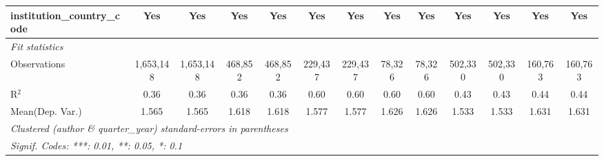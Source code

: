 \begin{tabular}{lcccccccccccc}
   institution\_country\_code               & Yes            & Yes          & Yes           & Yes           & Yes          & Yes            & Yes           & Yes            & Yes            & Yes           & Yes            & Yes\\  
   \midrule
   \emph{Fit statistics}\\
   Observations                             & 1,653,148      & 1,653,148    & 468,852       & 468,852       & 229,437      & 229,437        & 78,326        & 78,326         & 502,330        & 502,330       & 160,763        & 160,763\\  
   R$^2$                                    & 0.36           & 0.36         & 0.36          & 0.36          & 0.60         & 0.60           & 0.60          & 0.60           & 0.43           & 0.43          & 0.44           & 0.44\\  
Mean(Dep. Var.) & 1.565 & 1.565 & 1.618 & 1.618 & 1.577 & 1.577 & 1.626 & 1.626 & 1.533 & 1.533 & 1.631 & 1.631 \\
   \midrule \midrule
   \multicolumn{13}{l}{\emph{Clustered (author \& quarter\_year) standard-errors in parentheses}}\\
   \multicolumn{13}{l}{\emph{Signif. Codes: ***: 0.01, **: 0.05, *: 0.1}}\\
\end{tabular}
\par\endgroup
